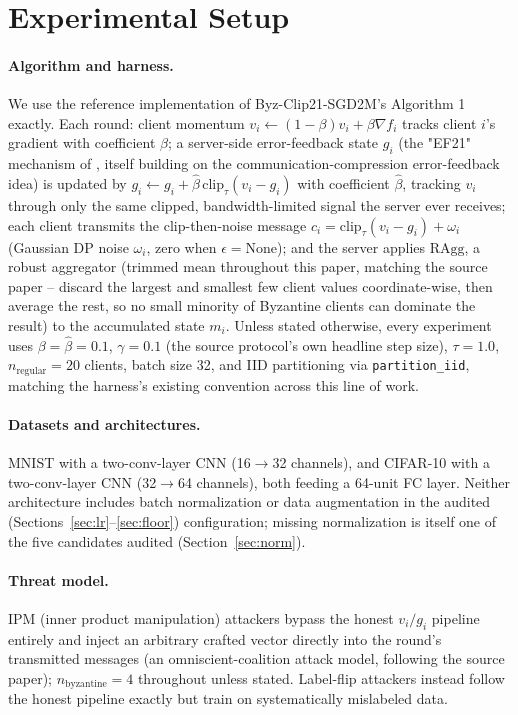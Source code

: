 \documentclass{article}
\begin{document}
\section{Experimental Setup}
\label{sec:setup}

\paragraph{Algorithm and harness.} We use the reference implementation of
Byz-Clip21-SGD2M's Algorithm 1 exactly. Each round: client momentum
$v_i \leftarrow (1-\beta)v_i + \beta \nabla f_i$ tracks client $i$'s gradient
with coefficient $\beta$; a server-side error-feedback state $g_i$ (the "EF21"
mechanism of \citealp{islamov2026byzclip}, itself building on the
communication-compression error-feedback idea) is updated by
$g_i \leftarrow g_i + \hat\beta\,\mathrm{clip}_\tau(v_i-g_i)$ with coefficient
$\hat\beta$, tracking $v_i$ through only the same clipped, bandwidth-limited
signal the server ever receives; each client transmits the clip-then-noise
message $c_i = \mathrm{clip}_\tau(v_i - g_i) + \omega_i$ (Gaussian DP noise
$\omega_i$, zero when $\epsilon{=}\mathrm{None}$); and the server applies
$\mathrm{RAgg}$, a robust aggregator (trimmed mean throughout this paper,
matching the source paper -- discard the largest and smallest few client
values coordinate-wise, then average the rest, so no small minority of
Byzantine clients can dominate the result) to the accumulated state $m_i$.
Unless stated otherwise, every
experiment uses $\beta = \hat\beta = 0.1$, $\gamma = 0.1$ (the source protocol's
own headline step size), $\tau = 1.0$, $n_{\mathrm{regular}}{=}20$ clients, batch
size 32, and IID partitioning via \texttt{partition\_iid}, matching the harness's
existing convention across this line of work.

\paragraph{Datasets and architectures.} MNIST \citep{lecun2010mnist} with a
two-conv-layer CNN (16$\to$32 channels), and CIFAR-10 \citep{krizhevsky2009cifar}
with a two-conv-layer CNN (32$\to$64 channels), both feeding a 64-unit FC layer.
Neither architecture includes batch normalization or data augmentation in the
audited (Sections~\ref{sec:lr}--\ref{sec:floor}) configuration; missing
normalization is itself one of the five candidates audited
(Section~\ref{sec:norm}).

\paragraph{Threat model.} IPM (inner product manipulation) attackers bypass the
honest $v_i/g_i$ pipeline entirely and inject an arbitrary crafted vector
directly into the round's transmitted messages (an omniscient-coalition attack
model, following the source paper); $n_{\mathrm{byzantine}}{=}4$ throughout unless
stated. Label-flip attackers instead follow the honest pipeline exactly but train
on systematically mislabeled data.
\end{document}
